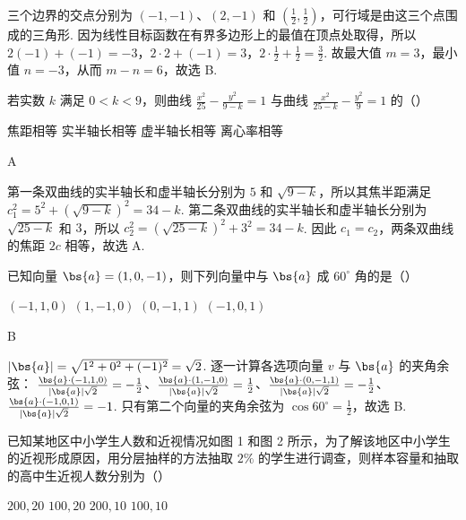 \begin{solution}
三个边界的交点分别为
\((-1,-1)\)、\((2,-1)\) 和 \(\left(\frac{1}{2},\frac{1}{2}\right)\)，可行域是由这三个点围成的三角形. 因为线性目标函数在有界多边形上的最值在顶点处取得，所以
\(2(-1)+(-1)=-3\)，\(2\cdot2+(-1)=3\)，\(2\cdot\frac{1}{2}+\frac{1}{2}=\frac{3}{2}\).
故最大值 \(m=3\)，最小值 \(n=-3\)，从而 \(m-n=6\)，故选 B.
\end{solution}

\begin{problem}
若实数 \(k\) 满足 \(0 < k < 9\)，则曲线 \(\frac{x^{2}}{25} - \frac{y^{2}}{9-k} = 1\) 与曲线 \(\frac{x^{2}}{25-k} - \frac{y^{2}}{9} = 1\) 的（\quad）

\choices
    {焦距相等}
    {实半轴长相等}
    {虚半轴长相等}
    {离心率相等}
\end{problem}

\begin{answer}
A
\end{answer}

\begin{solution}
第一条双曲线的实半轴长和虚半轴长分别为 \(5\) 和 \(\sqrt{9-k}\)，所以其焦半距满足
\(c_1^2=5^2+(\sqrt{9-k})^2=34-k\). 第二条双曲线的实半轴长和虚半轴长分别为 \(\sqrt{25-k}\) 和 \(3\)，所以
\(c_2^2=(\sqrt{25-k})^2+3^2=34-k\). 因此 \(c_1=c_2\)，两条双曲线的焦距 \(2c\) 相等，故选 A.
\end{solution}

\begin{problem}
已知向量 \(\bs{a} = (1, 0, -1)\)，则下列向量中与 \(\bs{a}\) 成 \(60^{\circ}\) 角的是（\quad）

\choices
    {\((-1, 1, 0)\)}
    {\((1, -1, 0)\)}
    {\((0, -1, 1)\)}
    {\((-1, 0, 1)\)}
\end{problem}

\begin{answer}
B
\end{answer}

\begin{solution}
\(\lvert\bs{a}\rvert=\sqrt{1^2+0^2+(-1)^2}=\sqrt{2}\). 逐一计算各选项向量 \(v\) 与 \(\bs{a}\) 的夹角余弦：
\(\frac{\bs{a}\cdot(-1,1,0)}{|\bs{a}|\sqrt{2}}=-\frac12\)、\(\frac{\bs{a}\cdot(1,-1,0)}{|\bs{a}|\sqrt{2}}=\frac12\)、\(\frac{\bs{a}\cdot(0,-1,1)}{|\bs{a}|\sqrt{2}}=-\frac12\)、\(\frac{\bs{a}\cdot(-1,0,1)}{|\bs{a}|\sqrt{2}}=-1\).
只有第二个向量的夹角余弦为 \(\cos60^\circ=\frac12\)，故选 B.
\end{solution}

\begin{problem}
已知某地区中小学生人数和近视情况如图 1 和图 2 所示，为了解该地区中小学生的近视形成原因，用分层抽样的方法抽取 \(2\%\) 的学生进行调查，则样本容量和抽取的高中生近视人数分别为（\quad）


\choices
    {\(200,20\)}
    {\(100,20\)}
    {\(200,10\)}
    {\(100,10\)}
\end{problem}

